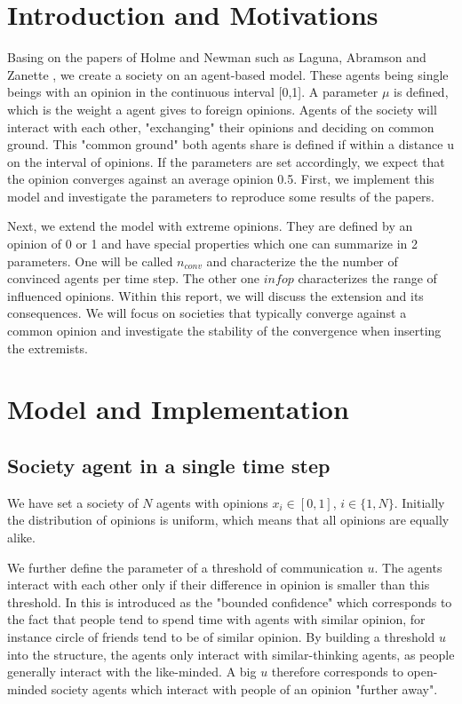 \documentclass[11pt]{article}
\begin{document}
\section{Introduction and Motivations}
Basing on the papers of Holme and Newman \cite{Coevolutions} such as Laguna, Abramson and Zanette \cite{Minor}, we create a society on an agent-based model. These agents being single beings with an opinion in the continuous interval [0,1]. A parameter $\mu$ is defined, which is the weight a agent gives to foreign opinions. Agents of the society will interact with each other, "exchanging" their opinions and deciding on common ground. This "common ground" both agents share is defined if within a distance u on the interval of opinions. If the parameters are set accordingly, we expect that the opinion converges against an average opinion 0.5. First, we implement this model and investigate the parameters to reproduce some results of the papers.

Next, we extend the model with extreme opinions. They are defined by an opinion of 0 or 1 and have special properties which one can summarize in 2 parameters. One will be called $n_{conv}$ and characterize the the number of convinced agents per time step. The other one $infop$ characterizes the range of influenced opinions. Within this report, we will discuss the extension and its consequences. We will focus on societies that typically converge against a common opinion and investigate the stability of the convergence when inserting the extremists.


\section{Model and Implementation}
\subsection{Society agent in a single time step}
We have set a society of $N$ agents with opinions $x_i \in [0,1]$, $i \in \{1, N \}$. Initially the distribution of opinions is uniform, which means that all opinions are equally alike.

We further define the parameter of a threshold of communication $u$. The agents interact with each other only if their difference in opinion is smaller than this threshold. In \cite{Minor} this is introduced as the "bounded confidence" which corresponds to the fact that people tend to spend time with agents with similar opinion, for instance circle of friends tend to be of similar opinion. By building a threshold $u$ into the structure, the agents only interact with similar-thinking agents, as people generally interact with the like-minded. A big $u$ therefore corresponds to open-minded society agents which interact with people of an opinion "further away".
\end{document}
